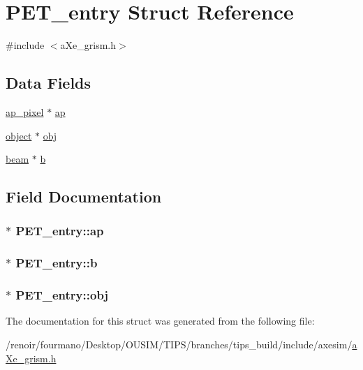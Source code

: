 \hypertarget{structPET__entry}{
\section{PET\_\-entry Struct Reference}
\label{structPET__entry}
}


{\ttfamily \#include $<$aXe\_\-grism.h$>$}\subsection*{Data Fields}
\begin{DoxyCompactItemize}
\item 
\hyperlink{structap__pixel}{ap\_\-pixel} $\ast$ \hyperlink{structPET__entry_a481221a839f5817abb3e00c725702f3e}{ap}
\item 
\hyperlink{structobject}{object} $\ast$ \hyperlink{structPET__entry_acf9dd9cf18cb45d7a91fb12f5a6f19aa}{obj}
\item 
\hyperlink{structbeam}{beam} $\ast$ \hyperlink{structPET__entry_a88302a0cf04ef0d973cada39fa2cffb5}{b}
\end{DoxyCompactItemize}


\subsection{Field Documentation}
\hypertarget{structPET__entry_a481221a839f5817abb3e00c725702f3e}{
\subsubsection[{ap}]{$\ast$ {\bf PET\_\-entry::ap}}}
\label{structPET__entry_a481221a839f5817abb3e00c725702f3e}
\hypertarget{structPET__entry_a88302a0cf04ef0d973cada39fa2cffb5}{
\subsubsection[{b}]{$\ast$ {\bf PET\_\-entry::b}}}
\label{structPET__entry_a88302a0cf04ef0d973cada39fa2cffb5}
\hypertarget{structPET__entry_acf9dd9cf18cb45d7a91fb12f5a6f19aa}{
\subsubsection[{obj}]{$\ast$ {\bf PET\_\-entry::obj}}}
\label{structPET__entry_acf9dd9cf18cb45d7a91fb12f5a6f19aa}


The documentation for this struct was generated from the following file:\begin{DoxyCompactItemize}
\item 
/renoir/fourmano/Desktop/OUSIM/TIPS/branches/tips\_\-build/include/axesim/\hyperlink{aXe__grism_8h}{aXe\_\-grism.h}\end{DoxyCompactItemize}
